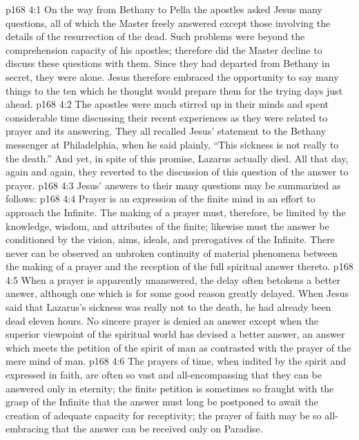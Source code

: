 \vs p168 4:1 On the way from Bethany to Pella the apostles asked Jesus many questions, all of which the Master freely answered except those involving the details of the resurrection of the dead. Such problems were beyond the comprehension capacity of his apostles; therefore did the Master decline to discuss these questions with them. Since they had departed from Bethany in secret, they were alone. Jesus therefore embraced the opportunity to say many things to the ten which he thought would prepare them for the trying days just ahead.
\vs p168 4:2 The apostles were much stirred up in their minds and spent considerable time discussing their recent experiences as they were related to prayer and its answering. They all recalled Jesus’ statement to the Bethany messenger at Philadelphia, when he said plainly, \textcolor{ubdarkred}{“This sickness is not really to the death.”} And yet, in spite of this promise, Lazarus actually died. All that day, again and again, they reverted to the discussion of this question of the answer to prayer.
\vs p168 4:3 Jesus’ answers to their many questions may be summarized as follows:
\vs p168 4:4 \bibnobreakspace Prayer is an expression of the finite mind in an effort to approach the Infinite. The making of a prayer must, therefore, be limited by the knowledge, wisdom, and attributes of the finite; likewise must the answer be conditioned by the vision, aims, ideals, and prerogatives of the Infinite. There never can be observed an unbroken continuity of material phenomena between the making of a prayer and the reception of the full spiritual answer thereto.
\vs p168 4:5 \pc {}\bibnobreakspace When a prayer is apparently unanswered, the delay often betokens a better answer, although one which is for some good reason greatly delayed. When Jesus said that Lazarus’s sickness was really not to the death, he had already been dead eleven hours. No sincere prayer is denied an answer except when the superior viewpoint of the spiritual world has devised a better answer, an answer which meets the petition of the spirit of man as contrasted with the prayer of the mere mind of man.
\vs p168 4:6 \pc {}\bibnobreakspace The prayers of time, when indited by the spirit and expressed in faith, are often so vast and all\hyp{}encompassing that they can be answered only in eternity; the finite petition is sometimes so fraught with the grasp of the Infinite that the answer must long be postponed to await the creation of adequate capacity for receptivity; the prayer of faith may be so all\hyp{}embracing that the answer can be received only on Paradise.
